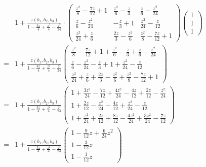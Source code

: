\documentclass[10pt,a4paper]{article}
\begin{document}
\begin{align*}
  &1 + \frac{z (b_1, b_2, b_3)}{1 - \frac{3z}{4} + \frac{z^2}{4} - \frac{z^3}{24}}\cdot   \begin{pmatrix}
    \frac{z^2}{8} - \frac{7z}{12}+1 & \frac{z^2}{6} - \frac{z}{3} & \frac{z}{6} - \frac{z^2}{24} \\
    \frac{z}{6} - \frac{z^2}{24} & -\frac{z}{3} + 1 & \frac{z^2}{24} - \frac{z}{12} \\
                                                                                           \frac{z^2}{24} + \frac{z}{6} & \frac{2z}{3} - \frac{z^2}{6} & \frac{z^2}{8} - \frac{7z}{12} + 1
                                                                                         \end{pmatrix}
  \begin{pmatrix}
    1 \\
    1 \\
    1
  \end{pmatrix} \\
  =&
  1 + \frac{z (b_1, b_2, b_3)}{1 - \frac{3z}{4} + \frac{z^2}{4} - \frac{z^3}{24}}
  \begin{pmatrix}
    \frac{z^2}{8}-\frac{7z}{12}+1 + \frac{z^2}{6} - \frac{z}{3} + \frac{z}{6} - \frac{z^2}{24} \\
    \frac{z}{6} - \frac{z^2}{24} - \frac{z}{3} + 1 + \frac{z^2}{24} - \frac{z}{12} \\
    \frac{z^2}{24} + \frac{z}{6} + \frac{2z}{3} - \frac{z^2}{6} + \frac{z^2}{8} - \frac{7z}{12} + 1
  \end{pmatrix} \\
  =&
   1 + \frac{z (b_1, b_2, b_3)}{1 - \frac{3z}{4} + \frac{z^2}{4} - \frac{z^3}{24}}
   \begin{pmatrix}
     1 + \frac{3z^2}{24}-\frac{7z}{12} + \frac{4z^2}{24} - \frac{4z}{12} + \frac{2z}{12} - \frac{z^2}{24} \\
     1 + \frac{2z}{12} - \frac{z^2}{24} - \frac{4z}{12} + \frac{z^2}{24} - \frac{z}{12} \\
     1 + \frac{z^2}{24} + \frac{2z}{12} + \frac{8z}{12} - \frac{4z^2}{24} + \frac{3z^2}{24} - \frac{7z}{12}
   \end{pmatrix} \\
     =&
   1 + \frac{z (b_1, b_2, b_3)}{1 - \frac{3z}{4} + \frac{z^2}{4} - \frac{z^3}{24}}
   \begin{pmatrix}
     1 - \frac{9}{12} z + \frac{6}{24}z^2 \\
     1 - \frac{3}{12} z \\
     1 - \frac{1}{12} z
   \end{pmatrix}
\end{align*}
\end{document}

